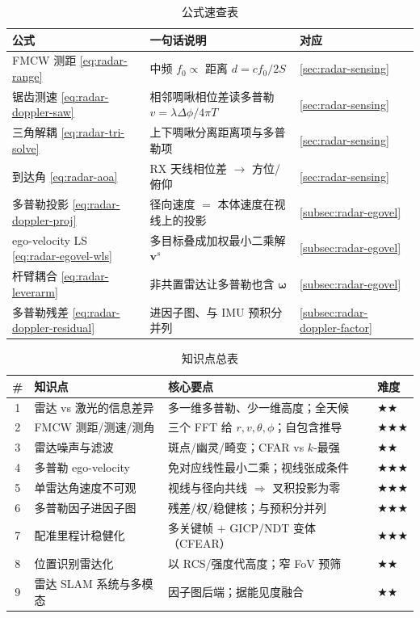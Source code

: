 \begin{table}[H]\centering\small
\caption{公式速查表}
\begin{tabular}{lll}
\toprule
公式 & 一句话说明 & 对应 \\
\midrule
FMCW 测距 \cref{eq:radar-range} & 中频 $f_0\propto$ 距离 $d=cf_0/2S$ & \cref{sec:radar-sensing} \\
锯齿测速 \cref{eq:radar-doppler-saw} & 相邻啁啾相位差读多普勒 $v=\lambda\Delta\phi/4\pi T$ & \cref{sec:radar-sensing} \\
三角解耦 \cref{eq:radar-tri-solve} & 上下啁啾分离距离项与多普勒项 & \cref{sec:radar-sensing} \\
到达角 \cref{eq:radar-aoa} & RX 天线相位差 $\to$ 方位/俯仰 & \cref{sec:radar-sensing} \\
多普勒投影 \cref{eq:radar-doppler-proj} & 径向速度 $=$ 本体速度在视线上的投影 & \cref{subsec:radar-egovel} \\
ego-velocity LS \cref{eq:radar-egovel-wls} & 多目标叠成加权最小二乘解 $\mathbf v^s$ & \cref{subsec:radar-egovel} \\
杆臂耦合 \cref{eq:radar-leverarm} & 非共置雷达让多普勒也含 $\boldsymbol\omega$ & \cref{subsec:radar-egovel} \\
多普勒残差 \cref{eq:radar-doppler-residual} & 进因子图、与 IMU 预积分并列 & \cref{subsec:radar-doppler-factor} \\
\bottomrule
\end{tabular}
\end{table}

\begin{table}[H]\centering\small
\caption{知识点总表}
\begin{tabular}{clll}
\toprule
\# & 知识点 & 核心要点 & 难度 \\
\midrule
1 & 雷达 vs 激光的信息差异 & 多一维多普勒、少一维高度；全天候 & $\bigstar\bigstar$ \\
2 & FMCW 测距/测速/测角 & 三个 FFT 给 $r,v,\theta,\phi$；自包含推导 & $\bigstar\bigstar\bigstar$ \\
3 & 雷达噪声与滤波 & 斑点/幽灵/畸变；CFAR vs $k$-最强 & $\bigstar\bigstar$ \\
4 & 多普勒 ego-velocity & 免对应线性最小二乘；视线张成条件 & $\bigstar\bigstar\bigstar$ \\
5 & 单雷达角速度不可观 & 视线与径向共线 $\Rightarrow$ 叉积投影为零 & $\bigstar\bigstar\bigstar$ \\
6 & 多普勒因子进因子图 & 残差/权/稳健核；与预积分并列 & $\bigstar\bigstar\bigstar$ \\
7 & 配准里程计稳健化 & 多关键帧 $+$ GICP/NDT 变体（CFEAR） & $\bigstar\bigstar\bigstar$ \\
8 & 位置识别雷达化 & 以 RCS/强度代高度；窄 FoV 预筛 & $\bigstar\bigstar$ \\
9 & 雷达 SLAM 系统与多模态 & 因子图后端；据能见度融合 & $\bigstar\bigstar$ \\
\bottomrule
\end{tabular}
\end{table}


